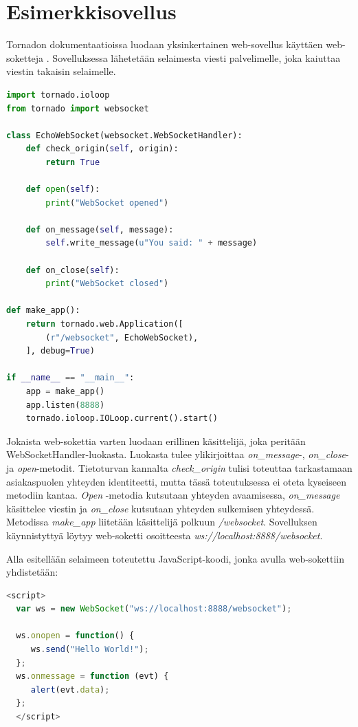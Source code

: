 \documentclass[utf8]{gradu3}
\begin{document}
\section{Esimerkkisovellus}

Tornadon dokumentaatioissa luodaan yksinkertainen web-sovellus käyttäen web-soketteja \parencite{tornado_socket}. Sovelluksessa lähetetään selaimesta viesti palvelimelle, joka kaiuttaa viestin takaisin selaimelle. 

\lstset{numbers=left}
\begin{lstlisting}[language=Python]
import tornado.ioloop
from tornado import websocket

class EchoWebSocket(websocket.WebSocketHandler):
    def check_origin(self, origin):
        return True

    def open(self):
        print("WebSocket opened")

    def on_message(self, message):
        self.write_message(u"You said: " + message)

    def on_close(self):
        print("WebSocket closed")

def make_app():
    return tornado.web.Application([
        (r"/websocket", EchoWebSocket),
    ], debug=True)

if __name__ == "__main__":
    app = make_app()
    app.listen(8888)
    tornado.ioloop.IOLoop.current().start()
\end{lstlisting}
Jokaista web-sokettia varten luodaan erillinen käsittelijä, joka peritään WebSocketHandler-luokasta. Luokasta tulee ylikirjoittaa \emph{on\_message}-, \emph{on\_close}- ja \emph{open}-metodit. Tietoturvan kannalta \emph{check\_origin} tulisi toteuttaa tarkastamaan asiakaspuolen yhteyden identiteetti, mutta tässä toteutuksessa ei oteta kyseiseen metodiin kantaa. \emph{Open} -metodia kutsutaan yhteyden avaamisessa, \emph{on\_message} käsittelee viestin ja \emph{on\_close} kutsutaan yhteyden sulkemisen yhteydessä. Metodissa \emph{make\_app} liitetään käsittelijä polkuun \emph{/websocket}. Sovelluksen käynnistyttyä löytyy web-soketti osoitteesta \emph{ws://localhost:8888/websocket}.

Alla esitellään selaimeen toteutettu JavaScript-koodi, jonka avulla web-sokettiin yhdistetään:

\begin{lstlisting}[language=JavaScript]
<script>
  var ws = new WebSocket("ws://localhost:8888/websocket");

  ws.onopen = function() {
     ws.send("Hello World!");
  };
  ws.onmessage = function (evt) {
     alert(evt.data);
  };
  </script>
\end{lstlisting}
\end{document}
